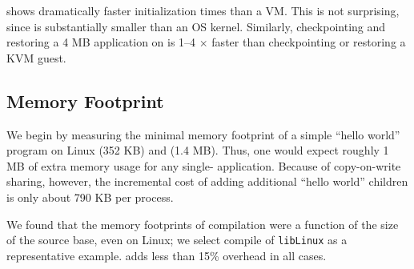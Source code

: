 \sysname{} shows dramatically faster initialization times than a VM. This is not surprising,
since \sysname{} is substantially smaller than an OS kernel. 
Similarly, checkpointing and restoring a 4 MB application on \sysname{} is 1--4 $\times$ faster than checkpointing or restoring a KVM guest.




\subsection{Memory Footprint}
\label{sec:graphene:eval:mem}

We begin by measuring the minimal memory footprint of a simple ``hello world'' program 
on Linux (352 KB) and \sysname{} (1.4 MB).
Thus, one would expect roughly 1 MB of extra memory usage for any single-\picoproc{} application.
Because of copy-on-write sharing, however, the incremental cost of adding additional ``hello world'' children
is only about 790 KB per process.

%


We found that the memory footprints of compilation were a function of the 
size of the source base, even on Linux; we select compile of {\tt libLinux} as a representative example.
\sysname{} adds less than 15\% overhead in all cases.

